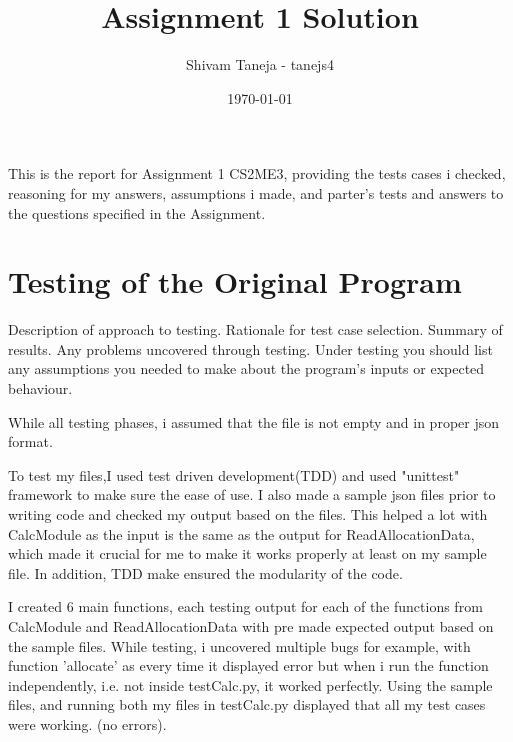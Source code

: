 \documentclass[12pt]{article}
\title{Assignment 1 Solution}
\author{Shivam Taneja - tanejs4}
\date{\today}
\begin{document}
\maketitle

This is the report for Assignment 1 CS2ME3, providing the tests cases i checked, reasoning for my answers, assumptions i made, and parter's tests and answers to the questions specified in the Assignment.

\section{Testing of the Original Program}

Description of approach to testing. Rationale for test case selection. Summary of results. Any problems uncovered through testing.
Under testing you should list any assumptions you needed to make about the program’s inputs or expected behaviour.

While all testing phases, i assumed that the file is not empty and in proper json format.

To test my files,I used test driven development(TDD) and used "unittest" framework to make sure the ease of use. I also made a sample json files prior to writing code and checked my output based on the files.
This helped a lot with CalcModule as the input is the same as the output for ReadAllocationData, which made it crucial for me to make it works properly at least on my sample file.
In addition, TDD make ensured the modularity of the code.

I created 6 main functions, each testing output for each of the functions from CalcModule and ReadAllocationData with pre made expected output based on the sample files. While testing, i uncovered multiple bugs for example, with function 'allocate' as every time it displayed error
but when i run the function independently, i.e. not inside testCalc.py, it worked perfectly.
 Using the sample files, and running both my files in testCalc.py displayed that all my test cases were working. (no errors).
\end{document}

